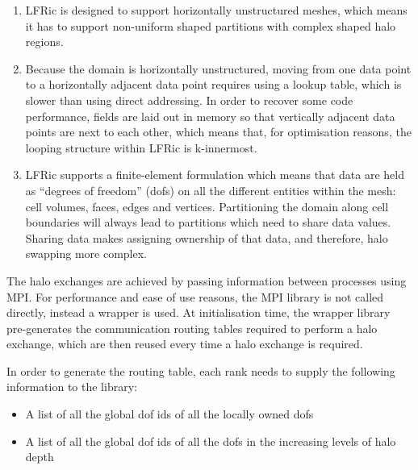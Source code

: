\documentclass[times]{elsarticle}
\begin{document}
\begin{enumerate}

\item LFRic is designed to support horizontally unstructured meshes,
which means it has to support non-uniform shaped partitions with complex
shaped halo regions.

\item Because the domain is horizontally unstructured, moving from one
data point to a horizontally adjacent data point requires using a lookup
table, which is slower than using direct addressing. In order to recover
some code performance, fields are laid out in memory so that vertically
adjacent data points are next to each other, which means that, for
optimisation reasons, the looping structure within LFRic is k-innermost.

\item LFRic supports a finite-element formulation which means that data
are held as ``degrees of freedom'' (dofs) on all the different
entities within the mesh: cell volumes, faces, edges and vertices.
Partitioning the domain along cell boundaries will always lead to
partitions which need to share data values. Sharing data makes assigning
ownership of that data, and therefore, halo swapping more complex.

\end{enumerate}

The halo exchanges are achieved by passing information between processes
using MPI. For performance and ease of use reasons, the MPI library is
not called directly, instead a wrapper is used. At initialisation time,
the wrapper library pre-generates the communication routing tables
required to perform a halo exchange, which are then reused every time a
halo exchange is required.

In order to generate the routing table, each rank needs to supply the
following information to the library:

\begin{itemize}

\item A list of all the global dof ids of all the locally owned dofs

\item A list of all the global dof ids of all the dofs in the increasing
levels of halo depth 

\end{itemize}
\end{document}
